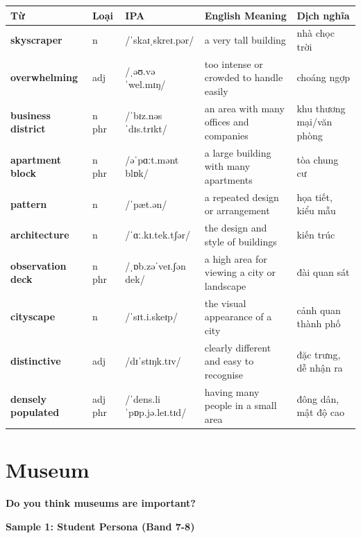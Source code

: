 \vspace{0.8em}
\begin{center}
\renewcommand{\arraystretch}{1.65}
\begin{tabularx}{\textwidth}{|V{0.22\textwidth}|C{0.07\textwidth}|I{0.20\textwidth}|Y|V{0.18\textwidth}|}
\hline
{}
\textbf{Từ} & \textbf{Loại} & \textbf{IPA} & \textbf{English Meaning} & \textbf{Dịch nghĩa} \\
\hline
\textbf{skyscraper} & n & /ˈskaɪˌskreɪ.pər/ & a very tall building & nhà chọc trời \\ \hline
\textbf{overwhelming} & adj & /ˌəʊ.vəˈwel.mɪŋ/ & too intense or crowded to handle easily & choáng ngợp \\ \hline
\textbf{business district} & n phr & /ˈbɪz.nəs ˈdɪs.trɪkt/ & an area with many offices and companies & khu thương mại/văn phòng \\ \hline
\textbf{apartment block} & n phr & /əˈpɑːt.mənt blɒk/ & a large building with many apartments & tòa chung cư \\ \hline
\textbf{pattern} & n & /ˈpæt.ən/ & a repeated design or arrangement & họa tiết, kiểu mẫu \\ \hline
\textbf{architecture} & n & /ˈɑː.kɪ.tek.tʃər/ & the design and style of buildings & kiến trúc \\ \hline
\textbf{observation deck} & n phr & /ˌɒb.zəˈveɪ.ʃən dek/ & a high area for viewing a city or landscape & đài quan sát \\ \hline
\textbf{cityscape} & n & /ˈsɪt.i.skeɪp/ & the visual appearance of a city & cảnh quan thành phố \\ \hline
\textbf{distinctive} & adj & /dɪˈstɪŋk.tɪv/ & clearly different and easy to recognise & đặc trưng, dễ nhận ra \\ \hline
\textbf{densely populated} & adj phr & /ˈdens.li ˈpɒp.jə.leɪ.tɪd/ & having many people in a small area & đông dân, mật độ cao \\ \hline
\end{tabularx}
\end{center}

\newpage

\section{Museum}
\begin{ieltsquestion}
\textbf{Do you think museums are important?}
\end{ieltsquestion}
\textbf{Sample 1: Student Persona (Band 7-8)}

